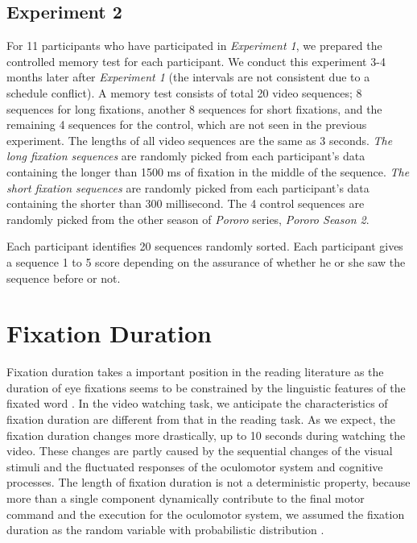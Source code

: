 \documentclass[10pt,letterpaper]{article}
\begin{document}
\subsection{Experiment 2}

For 11 participants who have participated in \textit{Experiment 1}, we prepared the controlled memory test for each participant. We conduct this experiment 3-4 months later after \textit{Experiment 1} (the intervals are not consistent due to a schedule conflict). A memory test consists of total 20 video sequences; 8 sequences for long fixations, another 8 sequences for short fixations, and the remaining 4 sequences for the control, which are not seen in the previous experiment. The lengths of all video sequences are the same as 3 seconds. \textit{The long fixation sequences} are randomly picked from each participant's data containing the longer than 1500 ms of fixation in the middle of the sequence. \textit{The short fixation sequences} are randomly picked from each participant's data containing the shorter than 300 millisecond. The 4 control sequences are randomly picked from the other season of \textit{Pororo} series, \textit{Pororo Season 2}.

Each participant identifies 20 sequences randomly sorted. Each participant gives a sequence 1 to 5 score depending on the assurance of whether he or she saw the sequence before or not. 

\section{Fixation Duration}
\label{sec:fixation-duration}

Fixation duration takes a important position in the reading literature as the duration of eye fixations seems to be constrained by the linguistic features of the fixated word \cite{Rayner1986,Inhoff1986}. In the video watching task, we anticipate the characteristics of fixation duration are different from that in the reading task. As we expect, the fixation duration changes more drastically, up to 10 seconds during watching the video. These changes are partly caused by the sequential changes of the visual stimuli and the fluctuated responses of the oculomotor system and cognitive processes. The length of fixation duration is not a deterministic property, because more than a single component dynamically contribute to the final motor command and the execution for the oculomotor system, we assumed the fixation duration as the random variable with probabilistic distribution \cite{Rayner1998,Reichle2004,Reichle2006}.
\end{document}
